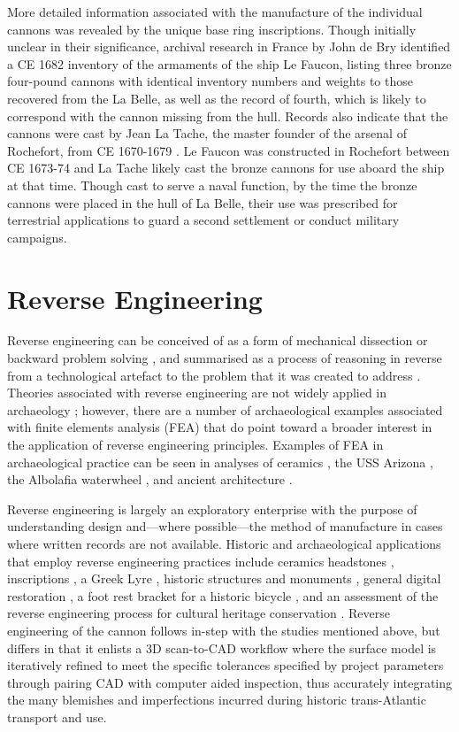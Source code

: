 \documentclass[review]{elsarticle}
\begin{document}
More detailed information associated with the manufacture of the individual cannons was revealed by the unique base ring inscriptions. Though initially unclear in their significance, archival research in France by John de Bry identified a CE 1682 inventory of the armaments of the ship Le Faucon, listing three bronze four-pound cannons with identical inventory numbers and weights to those recovered from the La Belle, as well as the record of fourth, which is likely to correspond with the cannon missing from the hull. Records also indicate that the cannons were cast by Jean La Tache, the master founder of the arsenal of Rochefort, from CE 1670-1679 \citep[356-357]{RN5763}. Le Faucon was constructed in Rochefort between CE 1673-74 and La Tache likely cast the bronze cannons for use aboard the ship at that time. Though cast to serve a naval function, by the time  the bronze cannons were placed in the hull of La Belle, their use was prescribed for terrestrial applications to guard a second settlement or conduct military campaigns.

\section*{Reverse Engineering}

Reverse engineering can be conceived of as a form of mechanical dissection or backward problem solving \citep{RN5750}, and summarised as a process of reasoning in reverse from a technological artefact to the problem that it was created to address \citep{RN5751}. Theories associated with reverse engineering are not widely applied in archaeology \citep{RN5752}; however, there are a number of archaeological examples associated with finite elements analysis (FEA) that do point toward a broader interest in the application of reverse engineering principles. Examples of FEA in archaeological practice can be seen in analyses of ceramics \citep{RN327,RN5753}, the USS Arizona \citep{RN325}, the Albolafia waterwheel \citep{RN5754}, and ancient architecture \citep{RN5755}.

Reverse engineering is largely an exploratory enterprise with the purpose of understanding design and---where possible---the method of manufacture in cases where written records are not available. Historic and archaeological applications that employ reverse engineering practices include ceramics \citep{RN5769,RN5770} headstones \citep{RN456}, inscriptions \citep{RN5756}, a Greek Lyre \citep{RN5757}, historic structures and monuments \citep{RN5771,RN5772}, general digital restoration \citep{RN5760}, a foot rest bracket for a historic bicycle \citep{RN5758}, and an assessment of the reverse engineering process for cultural heritage conservation \citep{RN5759}. Reverse engineering of the cannon follows in-step with the studies mentioned above, but differs in that it enlists a 3D scan-to-CAD workflow where the surface model is iteratively refined to meet the specific tolerances specified by project parameters through pairing CAD with computer aided inspection, thus accurately integrating the many blemishes and imperfections incurred during historic trans-Atlantic transport and use.
\end{document}
